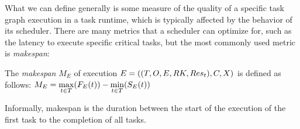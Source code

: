 What we can define generally is some measure of the quality of a specific task graph execution in a
task runtime, which is typically affected by the behavior of its scheduler. There are many metrics
that a scheduler can optimize for, such as the latency to execute specific critical tasks, but the
most commonly used metric is \emph{makespan}:

\vspace{2mm} The \emph{makespan} $M_E$ of execution
$E = ((T, O, E, RK, Res_t), C, X)$
is defined as follows: $M_E = \max\limits_{t \in T}(F_E(t)) - \min\limits_{t \in T}(S_E(t))$

\vspace{1mm}Informally, makespan is the duration between the start of the execution of the first task to the
completion of all tasks.

